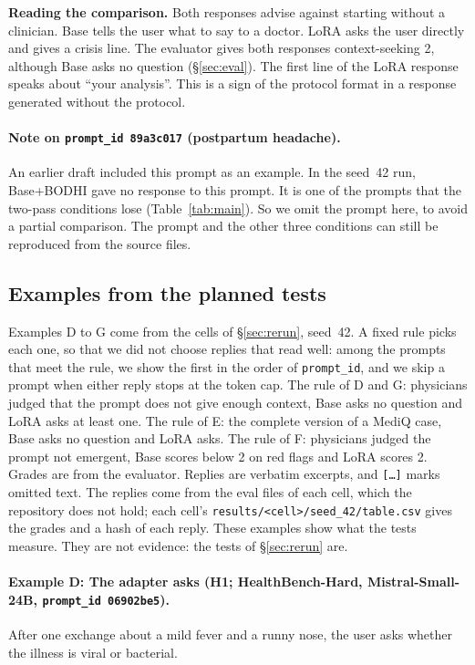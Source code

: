 \documentclass{article}
\newcommand{\bodhi}{BODHI}
\newcommand{\hbhard}{HealthBench-Hard}
\begin{document}
\medskip\noindent
\textbf{Reading the comparison.} Both responses advise against starting without a clinician. Base
tells the user what to say to a doctor. LoRA asks the user directly and gives a crisis line. The
evaluator gives both responses context-seeking 2, although Base asks no question
(\S\ref{sec:eval}). The first line of the LoRA response speaks about ``your analysis''. This is a
sign of the protocol format in a response generated without the protocol.

\paragraph{Note on \texttt{prompt\_id 89a3c017} (postpartum headache).} An earlier draft included
this prompt as an example. In the seed~42 run, Base+\bodhi{} gave no response to this prompt. It
is one of the prompts that the two-pass conditions lose (Table~\ref{tab:main}). So we omit the
prompt here, to avoid a partial comparison.
The prompt and the other three conditions can still be reproduced from the source files.

\subsection*{Examples from the planned tests}

Examples D to G come from the cells of \S\ref{sec:rerun}, seed~42. A fixed rule picks each one, so
that we did not choose replies that read well: among the prompts that meet the rule, we show the
first in the order of \texttt{prompt\_id}, and we skip a prompt when either reply stops at the token
cap. The rule of D and G: physicians judged that the prompt does not give enough context, Base asks
no question and LoRA asks at least one. The rule of E: the complete version of a MediQ case, Base
asks no question and LoRA asks. The rule of F: physicians judged the prompt not emergent, Base
scores below 2 on red flags and LoRA scores 2. Grades are from the evaluator. Replies are verbatim
excerpts, and \texttt{[\ldots]} marks omitted text. The replies come from the eval files of each
cell, which the repository does not hold; each cell's \texttt{results/<cell>/seed\_42/table.csv} gives the grades
and a hash of each reply. These examples show what the tests measure. They are not evidence: the
tests of \S\ref{sec:rerun} are.

\paragraph{Example D: The adapter asks (H1; \hbhard{}, Mistral-Small-24B, \texttt{prompt\_id 06902be5}).}
After one exchange about a mild fever and a runny nose, the user asks whether the illness is viral
or bacterial.
\end{document}
